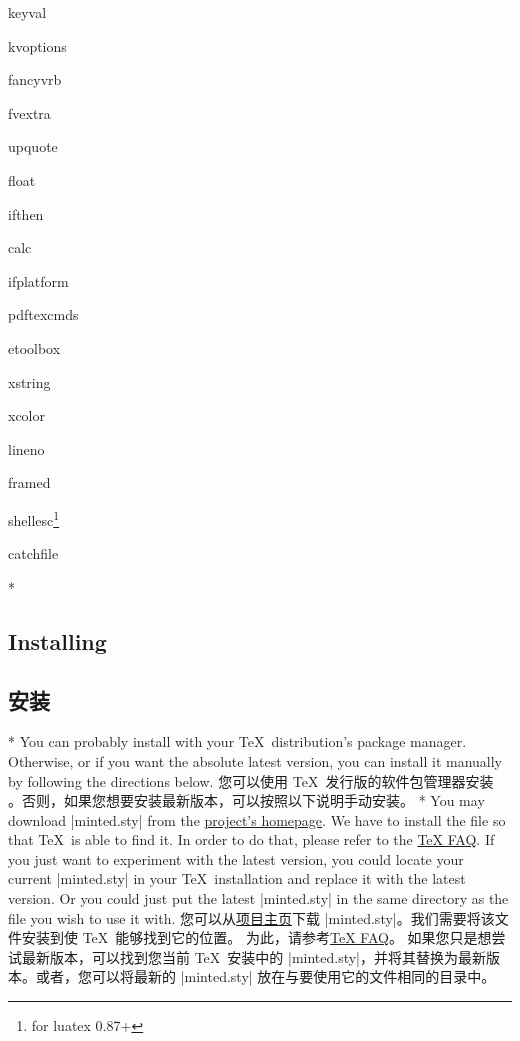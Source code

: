 \begin{multicols}{6}
\begingroup
\setlength\parskip{0pt}
\setlength\topsep{0pt}
\begin{list}{\textrm{}}{\ttfamily}
  \item keyval
  \item kvoptions
  \item fancyvrb
  \item fvextra
  \item upquote
  \item float
  \item ifthen
  \item calc
  \item ifplatform
  \item pdftexcmds
  \item etoolbox
  \item xstring
  \item xcolor
  \item lineno
  \item framed
  \item shellesc\footnote{for luatex 0.87+}
  \item catchfile
\end{list}
\endgroup
\end{multicols}

\begin{paracol}{2}
\switchcolumn[0]*%
\subsection{Installing }
\label{sec:installing:installing}
\switchcolumn
\subsection{安装 }
\switchcolumn[0]*%
You can probably install  with your \TeX\ distribution's package manager.  Otherwise, or if you want the absolute latest version, you can install it manually by following the directions below.
\switchcolumn
您可以使用 \TeX\ 发行版的软件包管理器安装 。否则，如果您想要安装最新版本，可以按照以下说明手动安装。
\switchcolumn[0]*%
You may download |minted.sty| from the
\href{https://github.com/gpoore/minted}{project's homepage}.  We have to install the file so that \TeX\ is able to find it.
In order to do that, please refer to the
\href{http://www.tex.ac.uk/cgi-bin/texfaq2html?label=inst-wlcf}{\TeX{} FAQ}.
If you just want to experiment with the latest version, you could locate your current |minted.sty| in your \TeX\ installation and replace it with the latest version.  Or you could just put the latest |minted.sty| in the same directory as the file you wish to use it with.
\switchcolumn
您可以从\href{https://github.com/gpoore/minted}{项目主页}下载 |minted.sty|。我们需要将该文件安装到使 \TeX\ 能够找到它的位置。
为此，请参考\href{http://www.tex.ac.uk/cgi-bin/texfaq2html?label=inst-wlcf}{\TeX{} FAQ}。
如果您只是想尝试最新版本，可以找到您当前 \TeX\ 安装中的 |minted.sty|，并将其替换为最新版本。或者，您可以将最新的 |minted.sty| 放在与要使用它的文件相同的目录中。
\end{paracol}